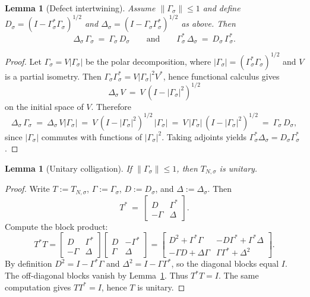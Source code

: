 \documentclass[11pt]{article}
\newtheorem{lemma}[theorem]{Lemma}
\theoremstyle{definition}
\theoremstyle{remark}
\theoremstyle{definition}
\begin{document}
\begin{lemma}[Defect intertwining]\label{lem:defect-intertwining}
Assume $\|\Gamma_\sigma\|\le 1$ and define $D_\sigma=(I-\Gamma_\sigma^*\Gamma_\sigma)^{1/2}$ and $\Delta_\sigma=(I-\Gamma_\sigma\Gamma_\sigma^*)^{1/2}$ as above. Then
\[
  \Delta_\sigma\,\Gamma_\sigma\ =\ \Gamma_\sigma\,D_\sigma
  \qquad\text{and}\qquad
  \Gamma_\sigma^*\,\Delta_\sigma\ =\ D_\sigma\,\Gamma_\sigma^*.
\]
\end{lemma}
\begin{proof}
Let $\Gamma_\sigma=V|\Gamma_\sigma|$ be the polar decomposition, where $|\Gamma_\sigma|=(\Gamma_\sigma^*\Gamma_\sigma)^{1/2}$ and $V$ is a partial isometry. Then
$\Gamma_\sigma\Gamma_\sigma^*=V|\Gamma_\sigma|^2V^*$, hence functional calculus gives
\[
  \Delta_\sigma\,V\ =\ V\,(I-|\Gamma_\sigma|^2)^{1/2}
\]
on the initial space of $V$. Therefore
\[
  \Delta_\sigma\,\Gamma_\sigma\ =\ \Delta_\sigma\,V|\Gamma_\sigma|
  \ =\ V\,(I-|\Gamma_\sigma|^2)^{1/2}\,|\Gamma_\sigma|
  \ =\ V\,|\Gamma_\sigma|\,(I-|\Gamma_\sigma|^2)^{1/2}
  \ =\ \Gamma_\sigma\,D_\sigma,
\]
since $|\Gamma_\sigma|$ commutes with functions of $|\Gamma_\sigma|^2$. Taking adjoints yields $\Gamma_\sigma^*\Delta_\sigma=D_\sigma\Gamma_\sigma^*$.
\end{proof}

\begin{lemma}[Unitary colligation]\label{lem:TN-unitary}
If $\|\Gamma_\sigma\|\le 1$, then $T_{N,\sigma}$ is unitary.
\end{lemma}
\begin{proof}
Write $T:=T_{N,\sigma}$, $\Gamma:=\Gamma_\sigma$, $D:=D_\sigma$, and $\Delta:=\Delta_\sigma$.
Then
\[
  T^*\ =\ \begin{bmatrix} D & \Gamma^*\\ -\Gamma & \Delta\end{bmatrix}.
\]
Compute the block product:
\[
  T^*T
  =\begin{bmatrix} D & \Gamma^*\\ -\Gamma & \Delta\end{bmatrix}
   \begin{bmatrix} D & -\Gamma^*\\ \Gamma & \Delta\end{bmatrix}
  =\begin{bmatrix}
    D^2+\Gamma^*\Gamma & -D\Gamma^*+\Gamma^*\Delta\\
    -\Gamma D+\Delta\Gamma & \Gamma\Gamma^*+\Delta^2
  \end{bmatrix}.
\]
By definition $D^2=I-\Gamma^*\Gamma$ and $\Delta^2=I-\Gamma\Gamma^*$, so the diagonal blocks equal $I$.
The off-diagonal blocks vanish by Lemma~\ref{lem:defect-intertwining}.
Thus $T^*T=I$. The same computation gives $TT^*=I$, hence $T$ is unitary.
\end{proof}
\end{document}
